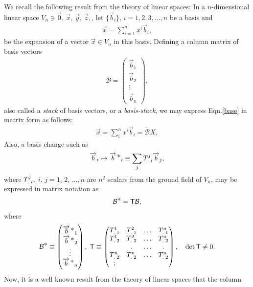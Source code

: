 We recall the following result from the theory of linear 
spaces: In a $n$-dimensional linear space $V_n\ni \vec{0}, 
\, 
\vec{x}, \,\vec{y},\,\vec{z},$, let $\{\vec{b}_i\}$, 
$i=1,2,3,\dots,n$ be a basis and
\begin{align}\label{base}
 \vec{x}=\sum_{i=1}^n x^i\vec{b}_i,
\end{align}
be the expansion of a vector $\vec{x}\in V_n$ in this 
basis. Defining a column matrix of basis vectors
\begin{align}
\mathcal{B}=\begin{pmatrix}
\vec{b}_1\\\vec{b}_2\\ \vdots\\\vec{b}_n
\end{pmatrix},
\end{align}
also called a \textsl{stack} of basis vectors, or a 
\textsl{basis-stack}, we may express Eqn.\eqref{base} in 
matrix form as follows:
\begin{align}
 \vec{x}=\sum_i^n x^i\vec{b}_i=\tilde{\mathcal{B}}X,
\end{align}
Also, a basis change such as
\begin{align}\overrightarrow{b}_i\mapsto{\overrightarrow{b}^{\,{\ensuremath{\textstyle \ast}}}}_i \equiv \sum_j
{{T}^{j}_{.\;i}}\overrightarrow{b}_j,
\end{align}
where ${{T}^{j}_{.\;i}}$, $i,\,j=1,\,2,\,\dots,n$ are $n^2$ 
scalars from the  ground field of $V_n$, may be expressed 
in matrix notation as
\begin{align}
\mathcal{B}^{\textstyle \ast}=\mathsf{T}\mathcal{B},
\end{align}
where
\begin{align}
\mathcal{B}^{\textstyle \ast}\equiv \begin{pmatrix}
{\overrightarrow{b}^{\,{\ensuremath{\textstyle \ast}}}}_1\\{\overrightarrow{b}^{\,{\textstyle \ast}}}_2\\ \vdots\\{\overrightarrow{b}^{\,{\textstyle \ast}}}_n\end{pmatrix},\;
\mathsf{T}\equiv \begin{pmatrix}
{\ensuremath{{T}^{1}_{.\;1}}}& {{T}^{2}_{.\;1}}&\dots & {{T}^{n}_{.\;1}}\\
{{T}^{1}_{.\;2}}& {{T}^{2}_{.\;2}}&\dots & {{T}^{n}_{.\;2}}\\
&.&\dots &.\\
{{T}^{n}_{.\;2}}& {{T}^{n}_{.\;2}}&\dots & 
{{T}^{n}_{.\;2}}\\;
\end{pmatrix},\quad\det{\mathsf{T}}\neq 0.
\end{align}
Now, it is a well known 
result from the theory of linear spaces that the column 
